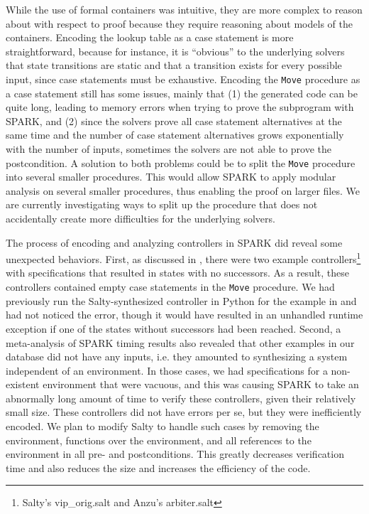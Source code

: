 \documentclass[runningheads]{llncs}
\begin{document}
While the use of formal containers was intuitive, they are more complex to reason about with respect to proof 
because they require reasoning about models of the containers. 
Encoding the lookup table as a case statement is more straightforward, because for instance, 
it is ``obvious'' to the underlying solvers that state transitions are static and that a transition exists for every possible input, since 
case statements must be exhaustive. 
Encoding the \lstinline{Move} procedure as a case statement still has some issues, mainly that 
(1) the generated code can be quite long, leading to memory errors when trying to prove the subprogram with SPARK, and
(2) since the solvers prove all case statement alternatives at the same time and the number of case statement alternatives grows 
exponentially with the number of inputs, sometimes the solvers are not able to prove the postcondition.
A solution to both problems could be to split the \lstinline{Move} procedure into several smaller procedures. %
This would allow SPARK to apply modular analysis on several smaller procedures, thus enabling the proof on larger files. 
We are currently investigating ways to split up the procedure that does not accidentally create more difficulties for the underlying solvers.

The process of encoding and analyzing controllers in SPARK did reveal some unexpected behaviors. 
First, as discussed in , there were two example controllers\footnote{Salty's vip\_orig.salt and Anzu's arbiter.salt} 
with specifications that resulted in states with no successors. 
As a result, these controllers contained empty case statements in the \lstinline{Move} procedure. 
We had previously run the Salty-synthesized controller in Python for the example in  and had not noticed the error, 
though it would have resulted in an unhandled runtime exception if one of the states without successors had been reached.  
Second, a meta-analysis of SPARK timing results also revealed that other examples in our database did not have any inputs, 
i.e. they amounted to synthesizing a system independent of an environment. 
In those cases, we had specifications for a non-existent environment that were vacuous, 
and this was causing SPARK to take an abnormally long amount of time to verify these controllers, given their relatively small size. 
These controllers did not have errors per se, 
but they were inefficiently encoded. 
We plan to modify Salty to handle such cases by removing the environment, functions over the environment, and
all references to the environment in all pre- and postconditions.
This greatly decreases verification time and also reduces the size and increases the efficiency of the code.
\end{document}
